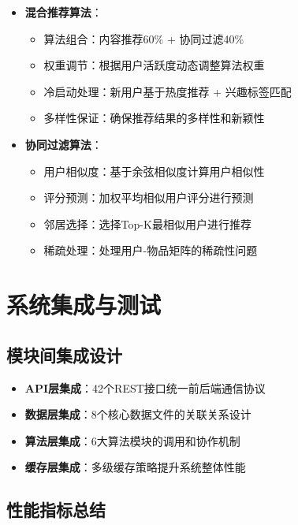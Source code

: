 \documentclass[12pt,a4paper]{article}
\begin{document}
\begin{itemize}
    \item \textbf{混合推荐算法}：
    \begin{itemize}
        \item 算法组合：内容推荐60\% + 协同过滤40\%
        \item 权重调节：根据用户活跃度动态调整算法权重
        \item 冷启动处理：新用户基于热度推荐 + 兴趣标签匹配
        \item 多样性保证：确保推荐结果的多样性和新颖性
    \end{itemize}
    
    \item \textbf{协同过滤算法}：
    \begin{itemize}
        \item 用户相似度：基于余弦相似度计算用户相似性
        \item 评分预测：加权平均相似用户评分进行预测
        \item 邻居选择：选择Top-K最相似用户进行推荐
        \item 稀疏处理：处理用户-物品矩阵的稀疏性问题
    \end{itemize}
\end{itemize}

\section{系统集成与测试}

\subsection{模块间集成设计}

\begin{successbox}[title={模块协作机制}]
\begin{itemize}[nosep]
    \item \textbf{API层集成}：42个REST接口统一前后端通信协议
    \item \textbf{数据层集成}：8个核心数据文件的关联关系设计
    \item \textbf{算法层集成}：6大算法模块的调用和协作机制
    \item \textbf{缓存层集成}：多级缓存策略提升系统整体性能
\end{itemize}
\end{successbox}

\subsection{性能指标总结}
\end{document}
